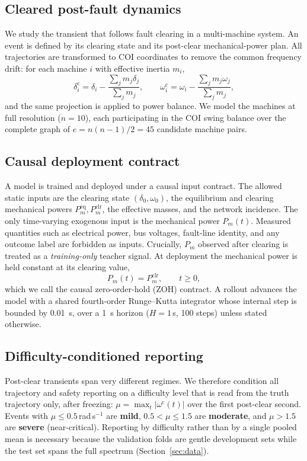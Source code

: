\documentclass[journal]{IEEEtran}
\begin{document}
\subsection{Cleared post-fault dynamics}
We study the transient that follows fault clearing in a multi-machine system. An
event is defined by its clearing state and its post-clear mechanical-power plan.
All trajectories are transformed to COI coordinates to remove the common
frequency drift: for each machine $i$ with effective inertia $m_i$,
\begin{equation}
\delta_i^{\mathrm c}=\delta_i-\frac{\sum_j m_j\delta_j}{\sum_j m_j},
\qquad
\omega_i^{\mathrm c}=\omega_i-\frac{\sum_j m_j\omega_j}{\sum_j m_j},
\label{eq:coi}
\end{equation}
and the same projection is applied to power balance. We model the machines at
full resolution ($n=10$), each participating in the COI swing balance over the
complete graph of $e=n(n-1)/2=45$ candidate machine pairs.

\subsection{Causal deployment contract}
A model is trained and deployed under a causal input contract. The allowed
static inputs are the clearing state $(\delta_0,\omega_0)$, the equilibrium and
clearing mechanical powers $P_m^{\mathrm{eq}}, P_m^{\mathrm{clr}}$, the effective
masses, and the network incidence. The only time-varying exogenous input is the
mechanical power $P_m(t)$. Measured quantities such as electrical power, bus
voltages, fault-line identity, and any outcome label are forbidden as inputs.
Crucially, $P_m$ observed after clearing is treated as a \emph{training-only}
teacher signal. At deployment the mechanical power is held constant at its
clearing value,
\begin{equation}
P_m(t) = P_m^{\mathrm{clr}}, \qquad t \geq 0,
\label{eq:zoh}
\end{equation}
which we call the causal zero-order-hold (ZOH) contract. A rollout advances the
model with a shared fourth-order Runge--Kutta integrator whose internal step is
bounded by 0.01~s, over a 1~s horizon ($H{=}1$\,s, 100 steps) unless stated
otherwise.

\subsection{Difficulty-conditioned reporting}
Post-clear transients span very different regimes. We therefore condition all
trajectory and safety reporting on a difficulty level that is read from the
truth trajectory only, after freezing: $\mu = \max_t |\omega^{\mathrm c}(t)|$ over
the first post-clear second. Events with $\mu \leq 0.5$\,rad\,s$^{-1}$ are
\textbf{mild}, $0.5 < \mu \leq 1.5$ are \textbf{moderate}, and $\mu > 1.5$ are
\textbf{severe} (near-critical). Reporting by difficulty rather than by a single
pooled mean is necessary because the validation folds are gentle development
sets while the test set spans the full spectrum (Section~\ref{sec:data}).
\end{document}
